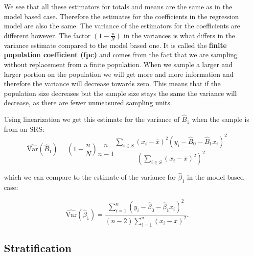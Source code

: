 \documentclass{article}
\begin{document}
We see that all these estimators for totals and means are the same as in the
model based case. Therefore the estimates for the coefficients in the regression
model are also the same. The variance of the estimators for the coefficients are
different however.
The factor \(\left( 1 - \frac{n}{N} \right)\) in the variances is what differs in
the variance estimate compared to the model based one. It is called the
\textbf{finite population coefficient (fpc)} and comes from the fact that we are
sampling without replacement from a finite population.
When we sample a larger and larger portion on the population we will get more
and more information and therefore the variance will decrease towards zero.
This means that if the population size decreases but the sample size stays the
same the variance will decrease, as there are fewer unmeasured sampling units.

Using linearization we get this estimate for the variance of \(\hat{B}_1\) when
the sample is from an SRS:
\begin{equation*}
\widehat{\mathrm{Var}}(\hat{B}_1) = \left( 1 - \frac{n}{N} \right) \frac{n}{n - 1} \frac{\sum_{i \in S} \left( x_i - \bar{x} \right)^2 \left( y_i - \hat{B}_0 - \hat{B}_1 x_i \right)^2}
{\left( \sum_{i \in S} \left( x_i - \bar{x} \right)^2 \right)^2}
\end{equation*}

which we can compare to the estimate of the variance for \(\hat{\beta}_1\) in
the model based case:

\begin{equation*}
  \widehat{\mathrm{Var}} \left( \hat{\beta}_1 \right) = \frac{\sum_{i = 1}^n\left( y_i - \hat{\beta}_0 -
  \hat{\beta}_1 x_i \right)^2}{
    \left( n - 2 \right)\sum_{i = 1}^n \left( x_i - \bar{x} \right)^2}.
\end{equation*}


\subsection{Stratification} \label{sec:strat}
\end{document}

